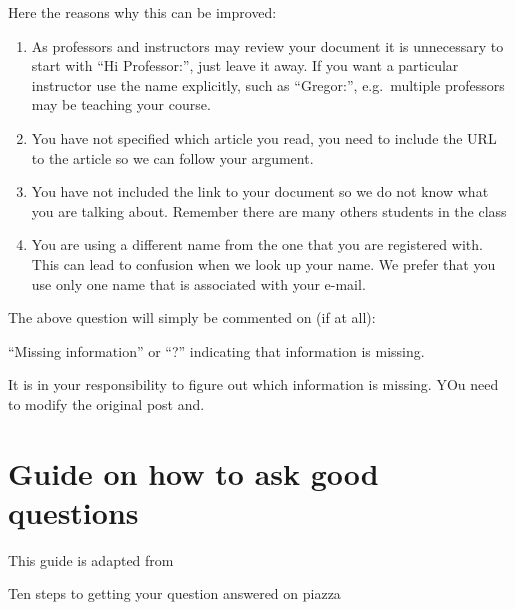 Here the reasons why this can be improved:

\begin{enumerate}
\item
  As professors and instructors may review your document it is
  unnecessary to start with ``Hi Professor:'', just leave it away. If
  you want a particular instructor use the name explicitly, such as
  ``Gregor:'', e.g.\ multiple professors may be teaching your course.
\item
  You have not specified which article you read, you need to include the
  URL to the article so we can follow your argument.
\item
  You have not included the link to your document so we do not know what
  you are talking about. Remember there are many others students in the
  class
\item
  You are using a different name from the one that you are registered
  with. This can lead to confusion when we look up your name. We prefer
  that you use only one name that is associated with your e-mail.
\end{enumerate}

The above question will simply be commented on (if at all):

``Missing information'' or ``?'' indicating that information is missing.

It is in your responsibility to figure out which information is
missing. YOu need to modify the original post and.

\section{Guide on how to ask good questions}

This guide is adapted from


Ten steps to getting your question answered on piazza

